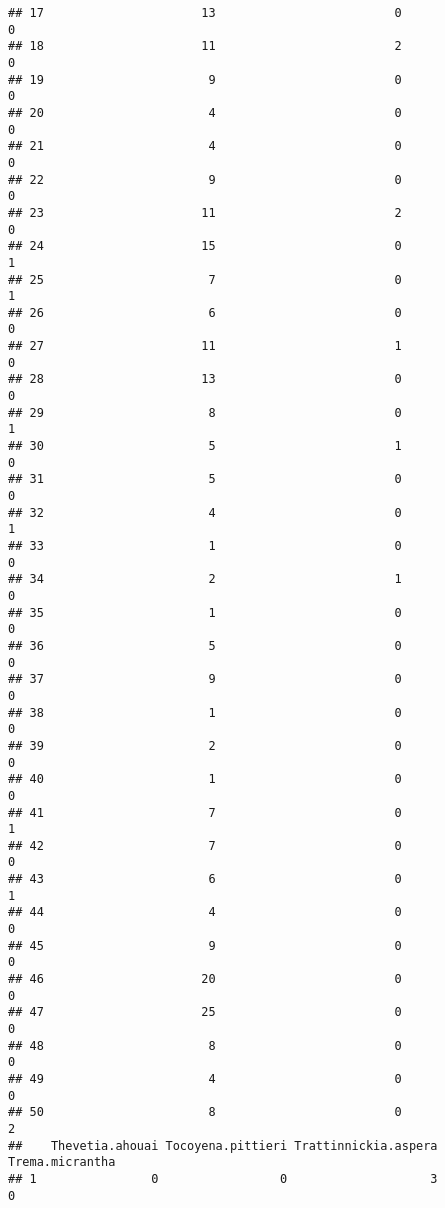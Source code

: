 \documentclass[
]{article}
\begin{document}
\begin{verbatim}
## 17                      13                         0               0
## 18                      11                         2               0
## 19                       9                         0               0
## 20                       4                         0               0
## 21                       4                         0               0
## 22                       9                         0               0
## 23                      11                         2               0
## 24                      15                         0               1
## 25                       7                         0               1
## 26                       6                         0               0
## 27                      11                         1               0
## 28                      13                         0               0
## 29                       8                         0               1
## 30                       5                         1               0
## 31                       5                         0               0
## 32                       4                         0               1
## 33                       1                         0               0
## 34                       2                         1               0
## 35                       1                         0               0
## 36                       5                         0               0
## 37                       9                         0               0
## 38                       1                         0               0
## 39                       2                         0               0
## 40                       1                         0               0
## 41                       7                         0               1
## 42                       7                         0               0
## 43                       6                         0               1
## 44                       4                         0               0
## 45                       9                         0               0
## 46                      20                         0               0
## 47                      25                         0               0
## 48                       8                         0               0
## 49                       4                         0               0
## 50                       8                         0               2
##    Thevetia.ahouai Tocoyena.pittieri Trattinnickia.aspera Trema.micrantha
## 1                0                 0                    3               0

\end{verbatim}
\end{document}
